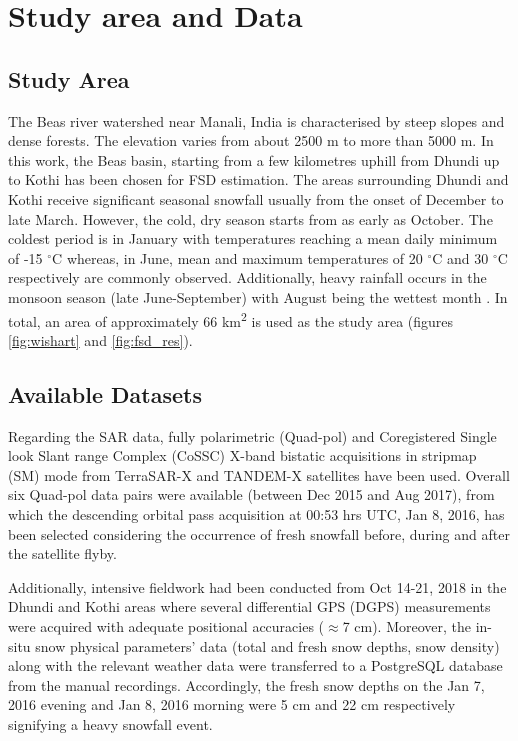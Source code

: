 \documentclass{article}
\begin{document}
\section{Study area and Data}
\label{sec:study}

\subsection{Study Area}
\label{ssec:area}
The Beas river watershed near Manali, India is characterised by steep slopes and dense forests. The elevation varies from about 2500 m to more than 5000 m. In this work, the Beas basin, starting from a few kilometres uphill from Dhundi up to Kothi has been chosen for FSD estimation. The areas surrounding Dhundi and Kothi receive significant seasonal snowfall usually from the onset of December to late March. However, the cold, dry season starts from as early as October. The coldest period is in January with temperatures reaching a mean daily minimum of -15 $^\circ$C whereas, in June, mean and maximum temperatures of 20 $^\circ$C and 30 $^\circ$C respectively are commonly observed. Additionally, heavy rainfall occurs in the monsoon season (late June-September) with August being the wettest month \cite{Thakur2012}. In total, an area of approximately 66 km\textsuperscript{2} is used as the study area (figures \ref{fig:wishart} and \ref{fig:fsd_res}).

\subsection{Available Datasets}
\label{ssec:data}
Regarding the SAR data, fully polarimetric (Quad-pol) and Coregistered Single look Slant range Complex (CoSSC) X-band bistatic acquisitions in stripmap (SM) mode from TerraSAR-X and TANDEM-X satellites have been used. Overall six Quad-pol data pairs were available (between Dec 2015 and Aug 2017), from which the descending orbital pass acquisition at 00:53 hrs UTC, Jan 8, 2016, has been selected considering the occurrence of fresh snowfall before, during and after the satellite flyby.

Additionally, intensive fieldwork had been conducted from Oct 14-21, 2018 in the Dhundi and Kothi areas where several differential GPS (DGPS) measurements were acquired with adequate positional accuracies ($\approx$7 cm). Moreover, the in-situ snow physical parameters’ data (total and fresh snow depths, snow density) along with the relevant weather data were transferred to a PostgreSQL database from the manual recordings. Accordingly, the fresh snow depths on the Jan 7, 2016 evening and Jan 8, 2016 morning were 5 cm and 22 cm respectively signifying a heavy snowfall event. 
\end{document}
